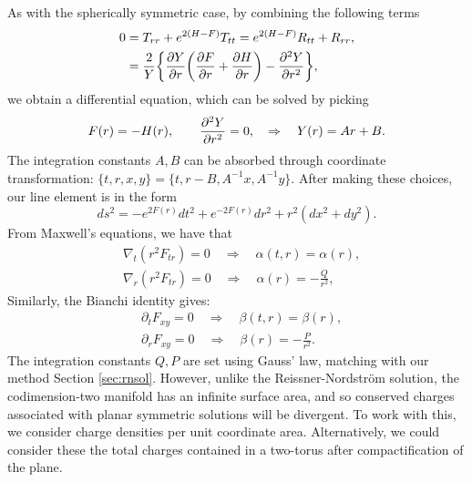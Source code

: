 As with the spherically symmetric case, by combining the following terms
\begin{equation*}
\begin{aligned}
   0 &= T_{rr} + e^{2(H-F)}T_{tt} = e^{2(H-F)}R_{tt} + R_{rr}, \\
   &= \frac{2}{Y} \bigg\{\frac{\partial Y}{\partial r} \bigg(\frac{\partial F}{\partial r} + \frac{\partial H}{\partial r} \bigg) - \frac{\partial ^2Y}{\partial r^2}\bigg\},
\end{aligned}
\end{equation*}
we obtain a differential equation, which can be solved by picking
\begin{equation*}
	F(r)  = - H(r), \qquad \frac{\partial ^2Y}{\partial r^2} = 0, \quad \Rightarrow \quad Y(r) = A r + B.
\end{equation*}
The integration constants $A,B$ can be absorbed through coordinate transformation: $\{t,r,x,y\} = \{t, r - B, A^{-1}x, A^{-1}y \}$. After making these choices, our line element is in the form
\begin{equation}
   ds^2 = -e^{2F(r)}dt^2 + e^{-2F(r)} dr^2 + r^2 (dx^2 + dy^2).
\end{equation}
From Maxwell's equations, we have that
\begin{equation*}
\begin{aligned}
   &\nabla_t (r^2 F_{tr}) = 0 \quad \Rightarrow  \quad \alpha(t,r) = \alpha(r), \\
   &\nabla_r (r^2 F_{tr}) = 0 \quad \Rightarrow \quad \alpha(r) = -\frac{Q}{r^2},
\end{aligned}
\end{equation*}
Similarly, the Bianchi identity gives:
\begin{equation*}
\begin{aligned}
     &\partial_t F_{xy} = 0 \quad \Rightarrow \quad \beta(t,r) = \beta(r), \\
     &\partial_r F_{xy} = 0 \quad \Rightarrow \quad \beta(r) = -\frac{P}{r^2}.
\end{aligned}
\end{equation*}
The integration constants $Q, P$ are set using Gauss' law, matching with our method Section \ref{sec:rnsol}. However, unlike the Reissner-Nordstr\"om solution, the codimension-two manifold has an infinite surface area, and so conserved charges associated with planar symmetric solutions will be divergent. To work with this, we  consider charge densities per unit coordinate area. Alternatively, we could consider these the total charges contained in a two-torus after compactification of the plane.

